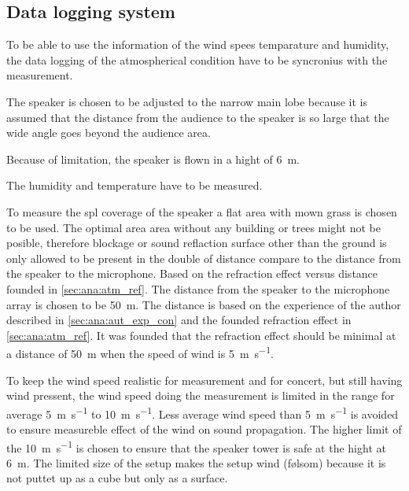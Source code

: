 \subsection{Data logging system} 

To be able to use the information of the wind spees temparature and humidity, the data logging of the atmospherical condition have to be syncronius with the measurement. 




The speaker is chosen to be adjusted to the narrow main lobe because it is assumed that the distance from the audience to the speaker is so large that the wide angle goes beyond the audience area.

Because of limitation, the speaker is flown in a hight of \SI{6}{\meter}. 

The humidity and temperature have to be measured.

To measure the \gls{spl} coverage of the speaker a flat area with mown grass is chosen to be used. The optimal area area without any building or trees might not be posible, therefore blockage or sound reflaction surface other than the ground is only allowed to be present in the double of distance compare to the distance from the speaker to the microphone. Based on the refraction effect versus distance founded in \autoref{sec:ana:atm_ref}. The distance from the speaker to the microphone array is chosen to be \SI{50}{\meter}. The distance is based on the experience of the author described in \autoref{sec:ana:aut_exp_con} and the founded refraction effect in \autoref{sec:ana:atm_ref}. It was founded that the refraction effect should be minimal at a distance of \SI{50}{\meter} when the speed of wind is \SI{5}{\meter\per\second}. 


To keep the wind speed realistic for measurement and for concert, but still having wind pressent, the wind speed doing the measurement is limited in the range for average \SI{5}{\meter\per\second} to \SI{10}{\meter\per\second}. Less average wind speed than \SI{5}{\meter\per\second} is avoided to ensure measureble effect of the wind on sound propagation. The higher limit of the \SI{10}{\meter\per\second} is chosen to ensure that the speaker tower is safe at the hight at \SI{6}{\meter}. The limited size of the setup makes the setup wind (følsom) because it is not puttet up as a cube but only as a surface. 




